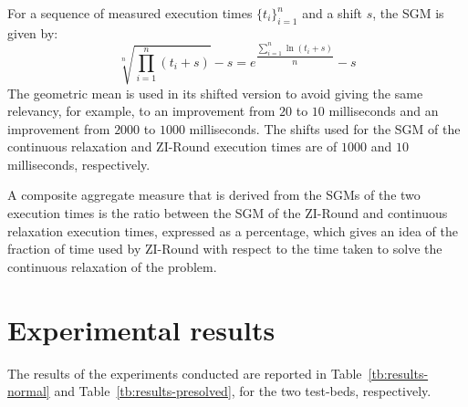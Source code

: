 \documentclass[a4paper,12pt]{book}
\begin{document}
For a sequence of measured execution times $\{t_i\}_{i=1}^{n}$ and a shift $s$, the SGM is given by:
\begin{equation}
	\sqrt[n]{\prod_{i=1}^{n}(t_i+s)} - s = e^{\dfrac{\sum_{i=1}^{n}\ln(t_i+s)}{n}}-s
\end{equation}
The geometric mean is used in its shifted version to avoid giving the same relevancy, for example, to an improvement from $20$ to $10$ milliseconds and an improvement from $2000$ to $1000$ milliseconds.
The shifts used for the SGM of the continuous relaxation and ZI-Round execution times are of $1000$ and $10$ milliseconds, respectively. \par 

A composite aggregate measure that is derived from the SGMs of the two execution times is the ratio between the SGM of the ZI-Round and continuous relaxation execution times, expressed as a percentage, which gives an idea of the fraction of time used by ZI-Round with respect to the time taken to solve the continuous relaxation of the problem.

\section{Experimental results} \label{sec:expresults}

The results of the experiments conducted are reported in Table~\ref{tb:results-normal} and Table~\ref{tb:results-presolved}, for the two test-beds, respectively.



\end{document}
